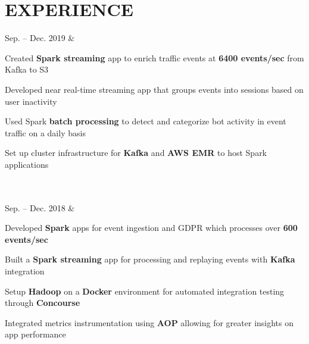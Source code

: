 \documentclass[]{richard-dang}
\begin{document}
\section*{EXPERIENCE}
\medbreak
\begin{tabularcv}
    Sep. – \newline 
    Dec. 2019   &  
                    \href{https://www.nerdwallet.com}{
                    }
                    \begin{tabitemize}
                        \item Created \textbf{Spark streaming} app to enrich traffic events at \textbf{6400 events/sec} from Kafka to S3
                        \item Developed near real-time streaming app that groups events into sessions based on user inactivity
                        \item Used Spark \textbf{batch processing} to detect and categorize bot activity in event traffic on a daily basis
                        \item Set up cluster infrastructure for \textbf{Kafka} and \textbf{AWS EMR} to host Spark applications
                    \end{tabitemize} 
                    \\[\vspacepar]\\[\vspacepar]
    Sep. – \newline 
    Dec. 2018   &  
                    \href{https://www.ultimatesoftware.com}{
                    }
                    \begin{tabitemize}
                        \item Developed \textbf{Spark} apps for event ingestion and GDPR which processes over \textbf{600 events/sec}
                        \item Built a \textbf{Spark streaming} app for processing and replaying events with \textbf{Kafka} integration
                        \item Setup \textbf{Hadoop} on a \textbf{Docker} environment for automated integration testing through \textbf{Concourse}
                        \item Integrated metrics instrumentation using \textbf{AOP} allowing for greater insights on app performance
                    \end{tabitemize} 
                    \\[\vspacepar]\\[\vspacepar]

\end{tabularcv}
\end{document}
